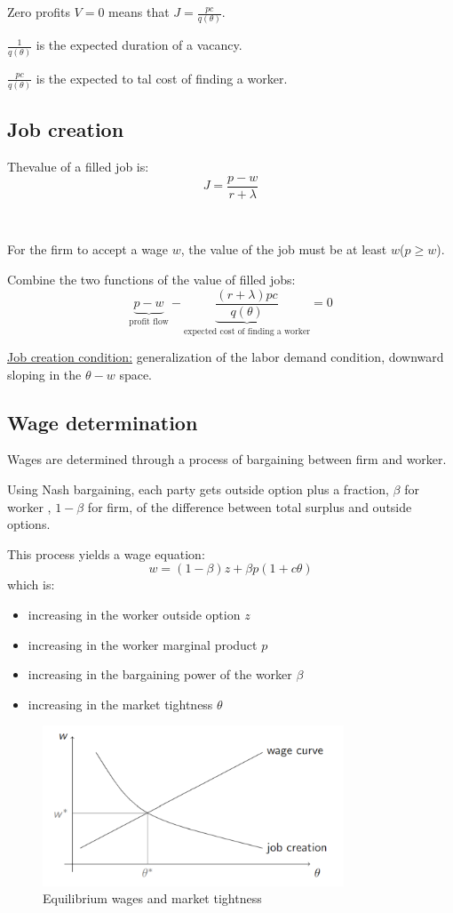 Zero profits $V = 0$ means that $J = \frac{pc}{q(\theta)}$.

$\frac{1}{q(\theta)}$ is the expected duration of a vacancy.

$\frac{pc}{q(\theta)}$ is the expected to tal cost of finding a worker.

\subsection{Job creation}
Thevalue of a filled job is: 
\[J = \frac{p-w}{r + \lambda}\]

\begin{note}
    \

    For the firm to accept a wage $w$, the value of the job must be at least $w$($p \geq w$).
\end{note}

Combine the two functions of the value of filled jobs: 
\[\underset{\text{profit flow}}{\underbrace{p-w}} - \underset{\text{expected cost of finding a worker}}{\underbrace{\frac{(r+\lambda)pc}{q(\theta)}}} = 0\]

\underline{Job creation condition:} generalization of the labor demand
condition, downward sloping in the $\theta - w$ space.

\subsection{Wage determination}
Wages are determined through a process of bargaining between
firm and worker. 

Using Nash bargaining, each party gets outside option plus a
fraction, $\beta $ for worker , $1-\beta $ for firm, of the difference
between total surplus and outside options. 

This process yields a wage equation:
\[w = (1-\beta)z + \beta p(1 + c \theta) \]
which is:
\begin{itemize}
    \item increasing in the worker outside option $z$
    \item increasing in the worker marginal product $p$
    \item increasing in the bargaining power of the worker $\beta$
    \item increasing in the market tightness $\theta$
\end{itemize}

\begin{figure}[!htbp]
    \centering
    \includegraphics[width=0.8\textwidth]{figures/wagejobeq.png}
    \caption{Equilibrium wages and market tightness}
\end{figure}

